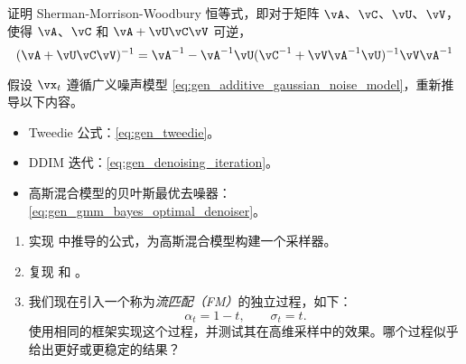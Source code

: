 \documentclass[../../book-main.tex]{subfiles}
\begin{document}
\begin{exercise}\label{exercise:sherman_morrison_woodbury_identity}
    证明 Sherman-Morrison-Woodbury 恒等式，即对于矩阵 \(\vA\)、\(\vC\)、\(\vU\)、\(\vV\)，使得 \(\vA\)、\(\vC\) 和 \(\vA + \vU\vC\vV\) 可逆，
    \begin{equation}
        (\vA + \vU\vC\vV)^{-1} = \vA^{-1} - \vA^{-1}\vU(\vC^{-1} + \vV\vA^{-1}\vU)^{-1}\vV\vA^{-1}
    \end{equation}
\end{exercise}

\begin{exercise}\label{exercise:generalizing_results_to_different_noise_models}
    假设 \(\vx_{t}\) 遵循广义噪声模型 \eqref{eq:gen_additive_gaussian_noise_model}，重新推导以下内容。
    \begin{itemize}
        \item Tweedie 公式：\eqref{eq:gen_tweedie}。
        \item DDIM 迭代：\eqref{eq:gen_denoising_iteration}。
        \item 高斯混合模型的贝叶斯最优去噪器：\eqref{eq:gen_gmm_bayes_optimal_denoiser}。
    \end{itemize}
\end{exercise}

\begin{exercise}\label{exercise:implement_denoising_processes}
\begin{enumerate}
    \item 实现  中推导的公式，为高斯混合模型构建一个采样器。
    \item 复现  和 。
    \item 我们现在引入一个称为\textit{流匹配（FM）}的独立过程，如下：
    \begin{equation}
        \alpha_{t} = 1 - t, \qquad \sigma_{t} = t.
    \end{equation}
    使用相同的框架实现这个过程，并测试其在高维采样中的效果。哪个过程似乎给出更好或更稳定的结果？
\end{enumerate}
\end{exercise}
\end{document}
